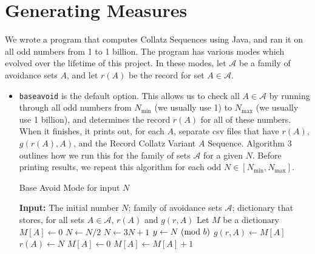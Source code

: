 \section{Generating Measures} \label{subsec:algcomp}
We wrote a program that computes Collatz Sequences using Java, and ran it on all odd numbers from 1 to 1 billion. The program has various modes which evolved over the lifetime of this project. In these modes, let $\mathcal{A}$ be a family of avoidance sets $A$, and let $r(A)$ be the record for set $A \in \mathcal{A}$.
\begin{itemize}
\item {\tt baseavoid} is the default option. This allows us to check all $A \in \mathcal{A}$ by running through all odd numbers from $N_{\min}$ (we usually use 1) to $N_{\max}$ (we usually use 1 billion), and determines the record $r(A)$ for all of these numbers. When it finishes, it prints out, for each $A$, separate csv files that have $r(A)$, $g(r(A),A)$, and the Record Collatz Variant $A$ Sequence. Algorithm 3 outlines how we run this for the family of sets $\mathcal{A}$ for a given $N$. Before printing results, we repeat this algorithm for each odd $N \in [N_{\min}, N_{\max}]$. 
\begin{algorithm}
    \label{alg:baseavoid}
\caption{Base Avoid Mode for input $N$}
\begin{algorithmic}[1]
    \State \textbf{Input:} The initial number $N$; family of avoidance sets $\mathcal{A}$; dictionary that stores, for all sets $A \in \mathcal{A}$,  $r(A)$ and $g(r,A)$ 
    \State Let $M$ be a dictionary
        \State $M[A] \gets 0$
    \EndFor
            \State $N \gets N/2$
        \Else       
            \State $N \gets 3N + 1$    
        \EndIf
        \State $y \gets N \ (\mathrm{mod}\ b)$
                    \State $g(r,A) \gets M[A]$
                    \State $r(A) \gets N$    
                 \EndIf
            \State $M[A] \gets 0$
            \Else
                \State $M[A] \gets M[A] + 1$
            \EndIf
        \EndFor
    \EndWhile
     
\end{algorithmic}
\end{algorithm}


\end{itemize}

